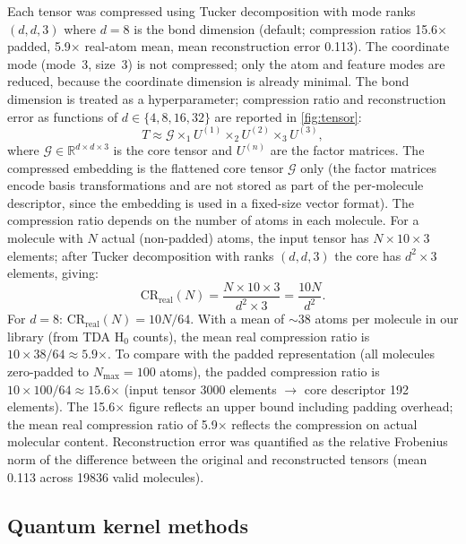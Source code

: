 \documentclass[11pt,a4paper]{article}
\begin{document}
Each tensor was compressed using Tucker decomposition \citep{tensorly_2019} with mode ranks $(d, d, 3)$ where $d = 8$ is the bond dimension (default; compression ratios \num{15.6}$\times$ padded, \num{5.9}$\times$ real-atom mean, mean reconstruction error \num{0.113}). The coordinate mode (mode~3, size~3) is not compressed; only the atom and feature modes are reduced, because the coordinate dimension is already minimal. The bond dimension is treated as a hyperparameter; compression ratio and reconstruction error as functions of $d \in \{4, 8, 16, 32\}$ are reported in \cref{fig:tensor}:
\begin{equation}
T \approx \mathcal{G} \times_1 U^{(1)} \times_2 U^{(2)} \times_3 U^{(3)},
\end{equation}
where $\mathcal{G} \in \mathbb{R}^{d \times d \times 3}$ is the core tensor and $U^{(n)}$ are the factor matrices. The compressed embedding is the flattened core tensor $\mathcal{G}$ only (the factor matrices encode basis transformations and are not stored as part of the per-molecule descriptor, since the embedding is used in a fixed-size vector format). The compression ratio depends on the number of atoms in each molecule. For a molecule with $N$ actual (non-padded) atoms, the input tensor has $N \times 10 \times 3$ elements; after Tucker decomposition with ranks $(d, d, 3)$ the core has $d^2 \times 3$ elements, giving:
\begin{equation}
\mathrm{CR}_{\text{real}}(N) = \frac{N \times 10 \times 3}{d^2 \times 3} = \frac{10N}{d^2}.
\end{equation}
For $d = 8$: $\mathrm{CR}_{\text{real}}(N) = 10N / 64$. With a mean of $\sim$38 atoms per molecule in our library (from TDA H$_0$ counts), the mean real compression ratio is $10 \times 38 / 64 \approx \num{5.9}$$\times$. To compare with the padded representation (all molecules zero-padded to $N_{\max}=100$ atoms), the padded compression ratio is $10 \times 100 / 64 \approx \num{15.6}$$\times$ (input tensor \num{3000} elements $\to$ core descriptor \num{192} elements). The \num{15.6}$\times$ figure reflects an upper bound including padding overhead; the mean real compression ratio of \num{5.9}$\times$ reflects the compression on actual molecular content. Reconstruction error was quantified as the relative Frobenius norm of the difference between the original and reconstructed tensors (mean \num{0.113} across \num{19836} valid molecules).

\subsection{Quantum kernel methods}
\end{document}
